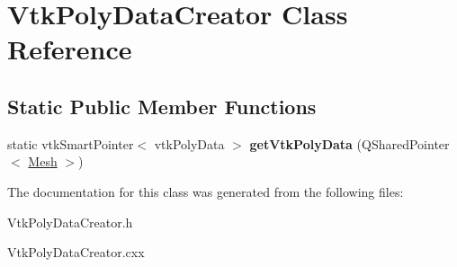 \hypertarget{class_vtk_poly_data_creator}{
\section{VtkPolyDataCreator Class Reference}
\label{class_vtk_poly_data_creator}
}
\subsection*{Static Public Member Functions}
\begin{DoxyCompactItemize}
\item 
\hypertarget{class_vtk_poly_data_creator_a0ecef362f7825ef4a6c93647d9023159}{
static vtkSmartPointer$<$ vtkPolyData $>$ {\bfseries getVtkPolyData} (QSharedPointer$<$ \hyperlink{class_mesh}{Mesh} $>$)}
\label{class_vtk_poly_data_creator_a0ecef362f7825ef4a6c93647d9023159}

\end{DoxyCompactItemize}


The documentation for this class was generated from the following files:\begin{DoxyCompactItemize}
\item 
VtkPolyDataCreator.h\item 
VtkPolyDataCreator.cxx\end{DoxyCompactItemize}
